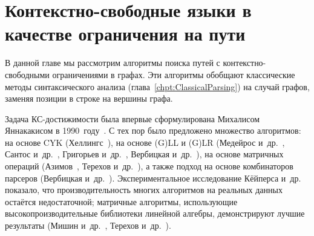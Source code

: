 \setchapterpreamble[u]{\margintoc}
\chapter{Контекстно-свободные языки в качестве ограничения на пути}
\label{chpt:CFPQ}


В данной главе мы рассмотрим алгоритмы поиска путей с контекстно-свободными ограничениями в графах. Эти алгоритмы обобщают классические методы синтаксического анализа (глава~\ref{chpt:ClassicalParsing}) на случай графов, заменяя позиции в строке на вершины графа.

Задача КС-достижимости была впервые сформулирована Михалисом Яннакакисом в 1990~году~.
С тех пор было предложено множество алгоритмов: на основе CYK (Хеллингс~), на основе (G)LL и (G)LR (Медейрос и~др.~, Сантос и~др.~, Григорьев и~др.~, Вербицкая и~др.~), на основе матричных операций (Азимов~, Терехов и~др.~), а также подход на основе комбинаторов парсеров (Вербицкая и~др.~).
Экспериментальное исследование Кёйперса и~др.~ показало, что производительность многих алгоритмов на реальных данных остаётся недостаточной; матричные алгоритмы, использующие высокопроизводительные библиотеки линейной алгебры, демонстрируют лучшие результаты (Мишин и~др.~, Терехов и~др.~).









